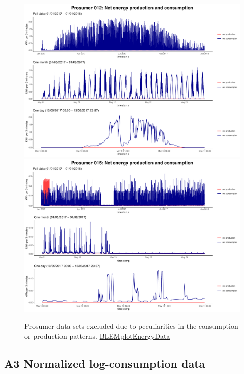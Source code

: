 \begin{centering}
\begin{figure}[H]
        \includegraphics[width=\textwidth-0.85cm]{thesis/graphs/timeseries/p012_prod&cons.pdf}\vspace{0.3cm}
        \includegraphics[width=\textwidth-0.85cm]{thesis/graphs/timeseries/p015_prod&cons.pdf}
        \caption[Prosumer data sets excluded due to peculiarities in the production patterns]{Prosumer data sets excluded due to peculiarities in the consumption or production patterns. \quantnet\href{https://github.com/QuantLet/BLEM/tree/master/BLEMplotEnergyData}{BLEMplotEnergyData}}
\end{figure}
\end{centering}


\subsection*{\hypertarget{AppA3:Figures:transform}{A3} Normalized log-consumption data}\label{AppA3:Figures:transform}

